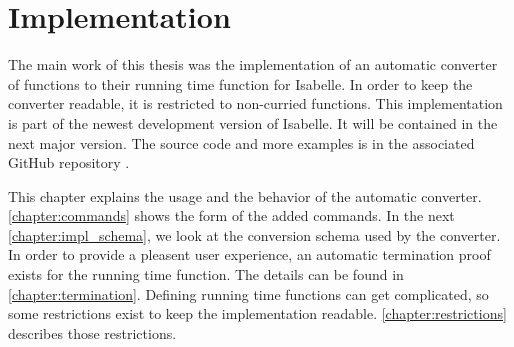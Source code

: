 
\chapter{Implementation}\label{chapter:impl}

The main work of this thesis was the implementation of an automatic converter of functions to their running time function for Isabelle.
In order to keep the converter readable, it is restricted to non-curried functions.
This implementation is part of the newest development version of Isabelle.
It will be contained in the next major version.
The source code and more examples is in the associated GitHub repository \cite{repo}.

This chapter explains the usage and the behavior of the automatic converter.
\autoref{chapter:commands} shows the form of the added commands.
In the next \autoref{chapter:impl_schema}, we look at the conversion schema used by the converter.
In order to provide a pleasent user experience, an automatic termination proof exists for the running time function.
The details can be found in \autoref{chapter:termination}.
Defining running time functions can get complicated, so some restrictions exist to keep the implementation readable.
\autoref{chapter:restrictions} describes those restrictions.






